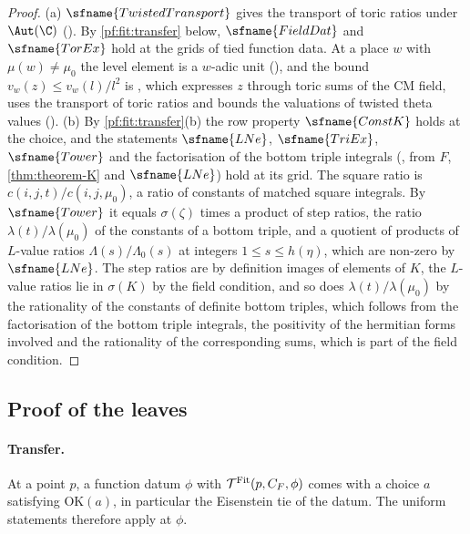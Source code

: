 \begin{proof}
(a) $\sfname{TwistedTransport}$ gives the transport of toric ratios under $\Aut(\C)$
(). By \cref{pf:fit:transfer} below,
$\sfname{FieldDat}$ and $\sfname{TorEx}$ hold at the grids of tied function data. At a place $w$ with $\mu(w)\ne\mu_0$ the
level element is a $w$-adic unit (), and the bound
$v_w(z)\le v_w(l)/l^2$ is , which expresses $z$ through
toric sums of the CM field, uses the transport of toric ratios and bounds the valuations of twisted theta values
().
(b) By \cref{pf:fit:transfer}(b) the row property $\sfname{ConstK}$ holds at the choice, and the statements $\sfname{LNe}$,
$\sfname{TriEx}$, $\sfname{Tower}$ and the factorisation of the bottom triple integrals
(, from $F$, \cref{thm:theorem-K} and $\sfname{LNe}$) hold
at its grid. The square ratio is $c(i,j,t)/c(i,j,\mu_0)$, a ratio of constants of matched square integrals. By
$\sfname{Tower}$ it equals $\sigma(\zeta)$ times a product of step ratios, the ratio $\lambda(t)/\lambda(\mu_0)$ of the
constants of a bottom triple, and a quotient of products of $L$-value ratios $\Lambda(s)/\Lambda_0(s)$ at integers $1\le s\le
h(\eta)$, which are non-zero by $\sfname{LNe}$. The step ratios are by definition images of elements of $K$, the $L$-value
ratios lie in $\sigma(K)$ by the field condition, and so does $\lambda(t)/\lambda(\mu_0)$ by the rationality of the constants
of definite bottom triples, which follows from the factorisation of the bottom triple integrals, the positivity of the
hermitian forms involved and the rationality of the corresponding sums, which is part of the field condition.
\end{proof}

\subsection{Proof of the leaves}\label{sec:pf:fit:leafproofs}

\paragraph{Transfer.}
At a point $p$, a function datum $\phi$ with $\mathcal T^{\mathrm{Fit}}(p,C_F,\phi)$ comes with a choice $a$ satisfying $\mathrm{OK}(a)$, in
particular the Eisenstein tie of the datum. The uniform statements therefore apply at $\phi$.

